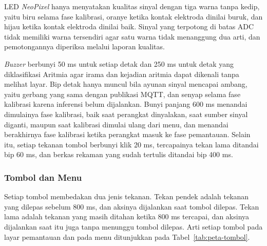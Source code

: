 LED \textit{NeoPixel} hanya menyatakan kualitas sinyal dengan tiga warna tanpa kedip, yaitu biru selama fase kalibrasi, oranye ketika kontak elektroda dinilai buruk, dan hijau ketika kontak elektroda dinilai baik. Sinyal yang terpotong di batas ADC tidak memiliki warna tersendiri agar satu warna tidak menanggung dua arti, dan pemotongannya diperiksa melalui laporan kualitas.

\textit{Buzzer} berbunyi 50 ms untuk setiap detak dan 250 ms untuk detak yang diklasifikasi Aritmia agar irama dan kejadian aritmia dapat dikenali tanpa melihat layar. Bip detak hanya muncul bila ayunan sinyal mencapai ambang, yaitu gerbang yang sama dengan publikasi MQTT, dan senyap selama fase kalibrasi karena inferensi belum dijalankan. Bunyi panjang 600 ms menandai dimulainya fase kalibrasi, baik saat perangkat dinyalakan, saat sumber sinyal diganti, maupun saat kalibrasi dimulai ulang dari menu, dan menandai berakhirnya fase kalibrasi ketika perangkat masuk ke fase pemantauan. Selain itu, setiap tekanan tombol berbunyi klik 20 ms, tercapainya tekan lama ditandai bip 60 ms, dan berkas rekaman yang sudah tertulis ditandai bip 400 ms.

\subsubsection{Tombol dan Menu}

Setiap tombol membedakan dua jenis tekanan. Tekan pendek adalah tekanan yang dilepas sebelum 800 ms, dan aksinya dijalankan saat tombol dilepas. Tekan lama adalah tekanan yang masih ditahan ketika 800 ms tercapai, dan aksinya dijalankan saat itu juga tanpa menunggu tombol dilepas. Arti setiap tombol pada layar pemantauan dan pada menu ditunjukkan pada Tabel~\ref{tab:peta-tombol}.

